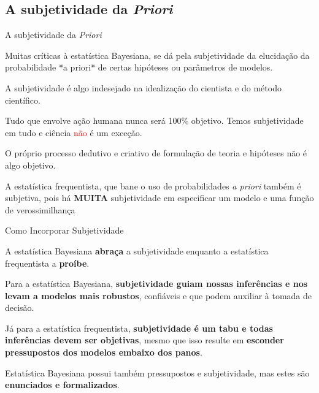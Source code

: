 \subsection{A subjetividade da \textit{Priori}}
\begin{frame}{A subjetividade da \textit{Priori}}
    \begin{vfilleditems}
        \item Muitas críticas à estatística Bayesiana, se dá pela subjetividade da
        elucidação da probabilidade *a priori* de certas hipóteses ou parâmetros de
        modelos.
        \item A subjetividade é algo indesejado na idealização do cientista e do
        método científico.
        \item Tudo que envolve ação humana nunca será 100\% objetivo.
        Temos subjetividade em tudo e ciência \textcolor{red}{não} é um exceção.
        \item O próprio processo dedutivo e criativo de formulação de teoria e
        hipóteses não é algo objetivo.
        \item A estatística frequentista, que bane o uso de probabilidades \textit{a priori}
        também é subjetiva, pois há \textbf{MUITA} subjetividade em especificar um modelo
        e uma função de verossimilhança \parencite{jaynesProbabilityTheoryLogic2003, vandeschootBayesianStatisticsModelling2021}
    \end{vfilleditems}
\end{frame}

\begin{frame}{Como Incorporar Subjetividade}
    \begin{vfilleditems}
        \item A estatística Bayesiana \textbf{abraça} a subjetividade enquanto a
        estatística frequentista a \textbf{proíbe}.
        \item Para a estatística Bayesiana, \textbf{subjetividade guiam nossas inferências e nos levam a modelos mais robustos},
        confiáveis e que podem auxiliar à tomada de decisão.
        \item Já para a estatística frequentista, \textbf{subjetividade é um tabu e todas inferências devem ser objetivas},
        mesmo que isso resulte em \textbf{esconder pressupostos dos modelos embaixo dos panos}.
        \item Estatística Bayesiana possui também pressupostos e subjetividade,
        mas estes são \textbf{enunciados e formalizados}.
    \end{vfilleditems}
\end{frame}

